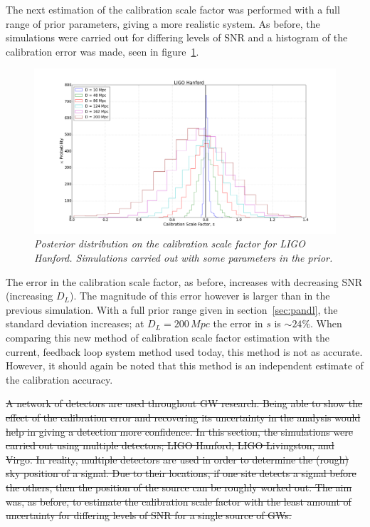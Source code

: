 \documentclass[12pt]{iopart}
\begin{document}
The next estimation of the calibration scale factor was performed with a full
range of prior parameters, giving a more realistic system. As before, the
simulations were carried out for differing levels of SNR and a histogram of the
calibration error was made, seen in figure~\ref{fig:sd-non-empty-D}.

\begin{figure}
  \centering
  \includegraphics[width = \textwidth]{SD_non_empty_D10_200}
  \caption{\textit{Posterior distribution on the calibration scale factor for
LIGO Hanford. Simulations carried out with some parameters in the prior.}}
  \label{fig:sd-non-empty-D}
\end{figure}

The error in the calibration scale factor, as before, increases with decreasing
SNR (increasing $D_{L}$). The magnitude of this error however is larger than in
the previous simulation. With a full prior range given in
section~\ref{sec:pandl}, the standard deviation increases; at $D_{L} =
200\,Mpc$ the error in $s$ is $\sim 24\%$. When comparing this new method of
calibration scale factor estimation with the current, feedback loop system
method used today, this method is not as accurate. However, it should again be
noted that this method is an independent estimate of the calibration accuracy.

\sout{A network of detectors are used throughout GW research. Being able to show the
effect of the calibration error and recovering its uncertainty in the analysis
would help in giving a detection more confidence. In this section, the
simulations were carried out using multiple detectors; LIGO Hanford, LIGO
Livingston, and Virgo. In reality, multiple detectors are used in order to
determine the (rough) sky position of a signal. Due to their locations, if one
site detects a signal before the others, then the position of the source can be
roughly worked out. The aim was, as before, to estimate the calibration scale
factor with the least amount of uncertainty for differing levels of SNR for a
single source of GWs.}
\end{document}
